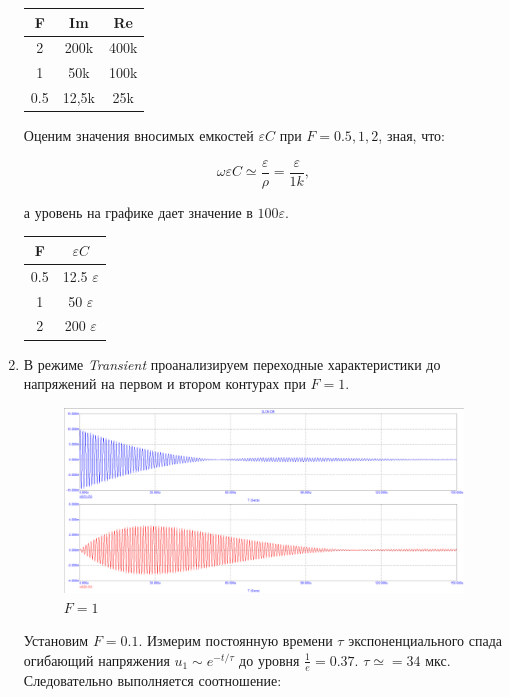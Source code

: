 \documentclass[a4paper, 12pt]{article}%
\begin{document}
\begin{enumerate}
\begin{center}
\begin{tabular}{|c|c|c|}
\hline 
F & Im & Re \\ 
\hline 
2 & 200k & 400k \\ 
\hline 
1 & 50k & 100k \\ 
\hline 
0.5 & 12,5k & 25k \\ 
\hline 
\end{tabular} 
\end{center}

Оценим значения вносимых емкостей $\varepsilon C$ при $F = 0.5,1,2$, зная, что:

\[\omega \varepsilon C \simeq \frac{\varepsilon}{\rho} = \frac{\varepsilon}{1k},\]

а уровень на графике дает значение в $100 \varepsilon$.

\begin{center}
\begin{tabular}{|c|c|}
\hline 
F & $\varepsilon C$ \\ 
\hline 
0.5 & 12.5 $\varepsilon$ \\ 
\hline 
1 & 50 $\varepsilon$\\ 
\hline 
2 & 200 $\varepsilon$\\ 
\hline 
\end{tabular} 
\end{center}

\newpage

\item В режиме \textit{Transient} проанализируем переходные характеристики до напряжений на первом и втором контурах при $F = 1$.

\begin{figure}[h!]
\centering
\includegraphics[scale = 0.4]{images/plot10_1.png}
\caption{$F = 1$}
\label{fig:Image1}
\end{figure}

Установим $F = 0.1$. Измерим постоянную времени $\tau$ экспоненциального спада огибающий напряжения $u_1 \sim e^{-t/\tau}$ до уровня $\frac{1}{e} = 0.37$. $\tau \simeq = 34$ мкс. Следовательно выполняется соотношение:


\end{enumerate}
\end{document}
